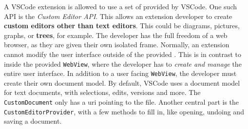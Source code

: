A \gls{VSCode} extension is allowed to use a set of  provided by \gls{VSCode}.
One such \acrshort{API} is the \textit{Custom Editor API}.
This allows an extension developer to create \textbf{custom editors other than text editors}.
This could be diagrams, pictures, graphs, or \textbf{trees}, for example.
The developer has the full freedom of a web browser, as they are given their own isolated frame.
Normally, an extension cannot modify the user interface outside of the provided .
This is in contrast to inside the provided \texttt{WebView}, where the developer has to \textit{create and manage} the entire user interface.
In addition to a user facing \texttt{WebView}, the developer must create their own document model.
By default, \gls{VSCode} uses a document model for text documents, with selections, edits, versions and more.
The \texttt{CustomDocument} only has a uri pointing to the file.
Another central part is the \texttt{CustomEditorProvider}, with a few methods to fill in, like opening, undoing and saving a document.

